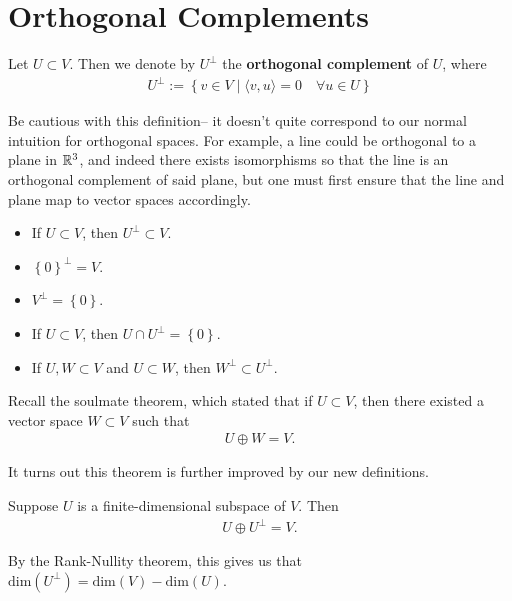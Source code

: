 \documentclass{memoir}
\begin{document}


\section{Orthogonal Complements}
\label{sec:orthogonal_complements}

\begin{defn}
	Let \(U\subset V\). Then we denote by \(U^{\perp}\) the \textbf{orthogonal complement} of \(U\), where
	\begin{align*}
		U^{\perp}:= \left\{v \in V \mid \langle v,u \rangle =0 \quad \forall u \in U \right\} 
	\end{align*}
\end{defn}
Be cautious with this definition-- it doesn't quite correspond to our normal intuition for orthogonal spaces. For example, a line could be orthogonal to a plane in \(\mathbb{R}^3\), and indeed there exists isomorphisms so that the line is an orthogonal complement of said plane, but one must first ensure that the line and plane map to vector spaces accordingly.

\begin{prop}
	\begin{itemize}
		\item If \(U\subset V\), then \(U^{\perp}\subset V\).
		\item \(\left\{ 0 \right\}^{\perp}= V\).
		\item \(V^{\perp} = \left\{ 0 \right\} \).
		\item If \(U\subset V\), then \(U\cap U^{\perp} = \left\{ 0 \right\} \).
		\item If \(U,W \subset V\) and \(U\subset W\), then \(W^{\perp}\subset U^{\perp}\).
	\end{itemize}
\end{prop}

Recall the soulmate theorem, which stated that if \(U\subset V\), then there existed a vector space \(W\subset V\) such that
\begin{align*}
	U \oplus W = V.
\end{align*}

It turns out this theorem is further improved by our new definitions.

\begin{thm}
	Suppose \(U\) is a finite-dimensional subspace of \(V\). Then
	\begin{align*}
		U \oplus U^{\perp} = V.
	\end{align*}
\end{thm}
By the Rank-Nullity theorem, this gives us that \(\textrm{dim}(U^{\perp}) = \textrm{dim}(V) - \textrm{dim}(U)\).
\end{document}
